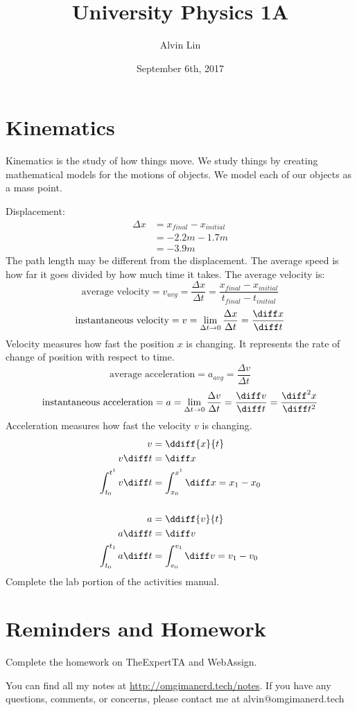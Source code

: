 \documentclass{math}
\title{University Physics 1A}
\author{Alvin Lin}
\date{September 6th, 2017}
\begin{document}
\maketitle

\section*{Kinematics}
Kinematics is the study of how things move. We study things by creating
mathematical models for the motions of objects. We model each of our objects
as a mass point.
\begin{center}
\end{center}
Displacement:
\begin{align*}
  \Delta x &= x_{final}-x_{initial} \\
  &= -2.2m-1.7m \\
  &= -3.9m
\end{align*}
The path length may be different from the displacement. The average speed is
how far it goes divided by how much time it takes. The average velocity is:
\[ \text{average velocity} = v_{avg} = \frac{\Delta x}{\Delta t} =
  \frac{x_{final}-x_{initial}}{t_{final}-t_{initial}} \]
\[ \text{instantaneous velocity} = v = \lim_{\Delta t\to0}\frac{\Delta x}
  {\Delta t} = \frac{\diff x}{\diff t} \]
Velocity measures how fast the position \( x \) is changing. It represents the
rate of change of position with respect to time.
\[ \text{average acceleration} = a_{avg} = \frac{\Delta v}{\Delta t} \]
\[ \text{instantaneous acceleration} = a = \lim_{\Delta t\to0}\frac{\Delta v}
  {\Delta t} = \frac{\diff v}{\diff t} = \frac{\diff^2 x}{\diff t^2} \]
Acceleration measures how fast the velocity \( v \) is changing.
\begin{align*}
  v &= \ddiff{x}{t} \\
  v\diff t &= \diff x \\
  \int_{t_0}^{t^1}v\diff t &= \int_{x_0}^{x^1}\diff x = x_1-x_0 \\ \\
  a &= \ddiff{v}{t} \\
  a\diff t &= \diff v \\
  \int_{t_0}^{t_1}a\diff t &= \int_{v_0}^{v_1}\diff v = v_1-v_0
\end{align*}
Complete the lab portion of the activities manual.

\section*{Reminders and Homework}
Complete the homework on TheExpertTA and WebAssign.

\begin{center}
  You can find all my notes at \url{http://omgimanerd.tech/notes}. If you have
  any questions, comments, or concerns, please contact me at
  alvin@omgimanerd.tech
\end{center}
\end{document}
